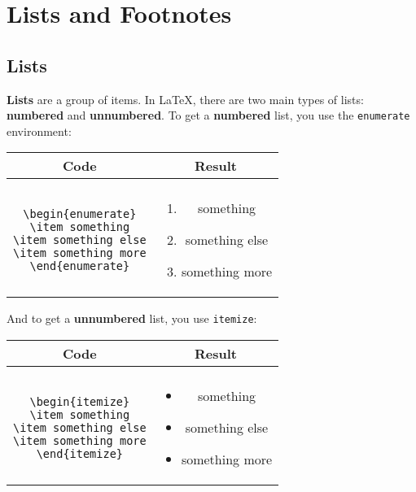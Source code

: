 \section{Lists and Footnotes}
\subsection{Lists}
\textbf{Lists} are a group of items. In \LaTeX, there are two main types of lists: \textbf{numbered} and \textbf{unnumbered}. To get a \textbf{numbered} list, you use the \texttt{enumerate} environment:\\

\begin{center}
\begin{tabular}{cc}

Code & Result\\
\hline\\

\parbox{4cm}{
	\texttt{\textbackslash begin\{enumerate\}\\
	\textbackslash item something\\
	\textbackslash item something else\\
	\textbackslash item something more\\
	\textbackslash end\{enumerate\}\\
	}
} 

&

\parbox{4cm}{
	\begin{enumerate}
	\item something
	\item something else
	\item something more
	\end{enumerate}
}

\end{tabular}
\end{center}

And to get a \textbf{unnumbered} list, you use \texttt{itemize}:\\

\begin{center}
\begin{tabular}{cc}

Code & Result\\
\hline\\

\parbox{4cm}{
	\texttt{\textbackslash begin\{itemize\}\\
	\textbackslash item something\\
	\textbackslash item something else\\
	\textbackslash item something more\\
	\textbackslash end\{itemize\}\\
	}
} 

&

\parbox{4cm}{
	\begin{itemize}
	\item something
	\item something else
	\item something more
	\end{itemize}
}

\end{tabular}
\end{center}


